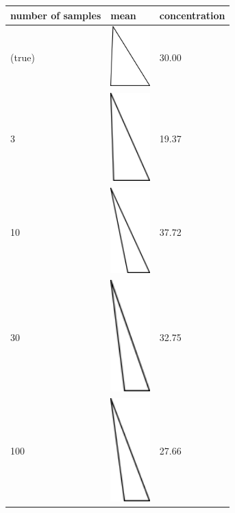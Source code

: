 \begin{table}
\begin{tabular}{l l l}
number of samples & mean & concentration\\ 
\hline
(true) & \includegraphics[width=0.6in]{output/1.models/samples_watson/watson_true.png} & 30.00\\ 
\hline
3 & \includegraphics[width=0.6in]{output/1.models/samples_watson/watson_est_3.png} & 19.37 \\ 
10 & \includegraphics[width=0.6in]{output/1.models/samples_watson/watson_est_10.png} & 37.72 \\ 
30 & \includegraphics[width=0.6in]{output/1.models/samples_watson/watson_est_30.png} & 32.75 \\ 
100 & \includegraphics[width=0.6in]{output/1.models/samples_watson/watson_est_100.png} & 27.66 \\ 

\end{tabular}
\end{table}
